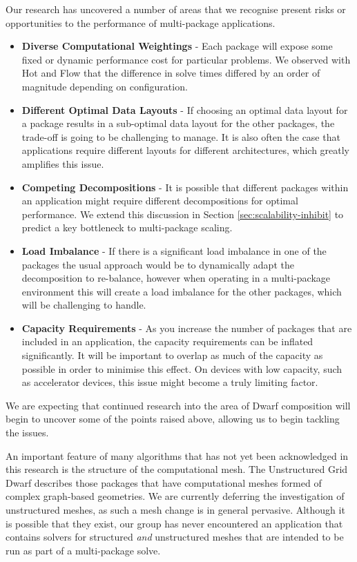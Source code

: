 \documentclass[runningheads,a4paper]{llncs}
\begin{document}
Our research has uncovered a number of areas that we recognise present risks or opportunities to the performance of multi-package applications. 

\begin{itemize}
  \item \textbf{Diverse Computational Weightings} - Each package will expose some fixed or dynamic performance cost for particular problems. We observed with Hot and Flow that the difference in solve times differed by an order of magnitude depending on configuration.
  \item \textbf{Different Optimal Data Layouts} - If choosing an optimal data layout for a package results in a sub-optimal data layout for the other packages, the trade-off is going to be challenging to manage. It is also often the case that applications require different layouts for different architectures, which greatly amplifies this issue. 
  \item \textbf{Competing Decompositions} - It is possible that different packages within an application might require different decompositions for optimal performance. We extend this discussion in Section \ref{sec:scalability-inhibit} to predict a key bottleneck to multi-package scaling.
  \item \textbf{Load Imbalance} - If there is a significant load imbalance in one of the packages the usual approach would be to dynamically adapt the decomposition to re-balance, however when operating in a multi-package environment this will create a load imbalance for the other packages, which will be challenging to handle.
  \item \textbf{Capacity Requirements} - As you increase the number of packages that are included in an application, the capacity requirements can be inflated significantly. It will be important to overlap as much of the capacity as possible in order to minimise this effect. On devices with low capacity, such as accelerator devices, this issue might become a truly limiting factor.
\end{itemize}

We are expecting that continued research into the area of Dwarf composition will begin to uncover some of the points raised above, allowing us to begin tackling the issues.

An important feature of many algorithms that has not yet been acknowledged in this research is the structure of the computational mesh. The Unstructured Grid Dwarf describes those packages that have computational meshes formed of complex graph-based geometries. We are currently deferring the investigation of unstructured meshes, as such a mesh change is in general pervasive. Although it is possible that they exist, our group has never encountered an application that contains solvers for structured \textit{and} unstructured meshes that are intended to be run as part of a multi-package solve.
\end{document}
